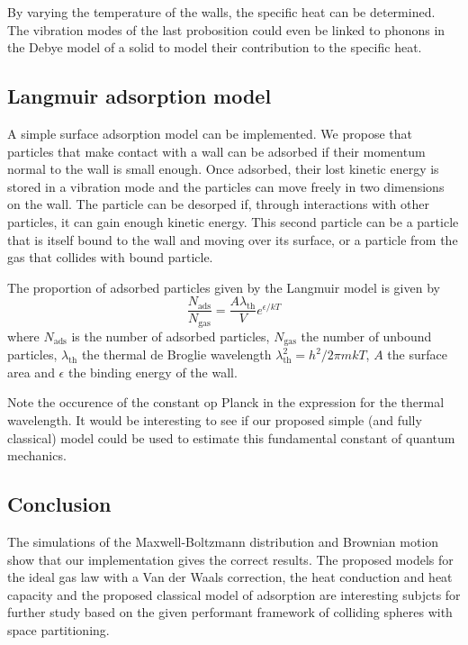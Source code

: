 By varying the temperature of the walls, the specific heat can be 
determined. The vibration modes of the last probosition could even be 
linked to phonons in the Debye model of a solid to model their contribution 
to the specific heat.


\subsection{Langmuir adsorption model}

A simple surface adsorption model can be implemented. We propose that particles 
that make contact with a wall can be adsorbed if their momentum normal to the 
wall is small enough. Once adsorbed, their lost kinetic energy is stored in a 
vibration mode and the particles can move freely in two dimensions on the 
wall.  The particle can be desorped if, through interactions with other 
particles, it can gain enough kinetic energy. This second particle can be a 
particle that is itself bound to the wall and moving over its surface, or a 
particle from the gas that collides with bound particle.

The proportion of adsorbed particles given by the Langmuir model is given 
by\cite{adsorptionModel}
$$
\frac{N_\mathrm{ads}}{N_\mathrm{gas}} =
\frac{A \lambda_\mathrm{th}}{V}e^{\epsilon/kT}
$$
where $N_\mathrm{ads}$ is the number of adsorbed particles, $N_\mathrm{gas} 
$ the number of unbound particles, $\lambda_{\textrm{th}}$ the thermal de 
Broglie wavelength $\lambda_{\mathrm{th}}^2 = h^2 / 2 \pi m k T$, $A$ the 
surface area and $\epsilon$ the binding energy of the wall.

Note the occurence of the constant op Planck in the expression for the 
thermal wavelength. It would be interesting to see if our proposed simple 
(and fully classical) model could be used to estimate this fundamental 
constant of quantum mechanics.


\subsection{Conclusion}
The simulations of the Maxwell-Boltzmann distribution and Brownian motion 
show that our implementation gives the correct results. The proposed models
for the ideal gas law with a Van der Waals correction, the heat conduction 
and heat capacity and the proposed classical model of adsorption are 
interesting subjcts for further study based on the given performant 
framework of colliding spheres with space partitioning.


